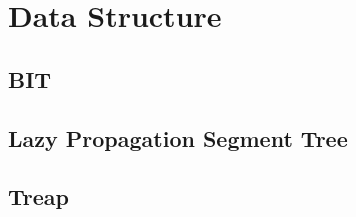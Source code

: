\documentclass[a4paper,10pt,twocolumn,oneside,x11names]{article}
\begin{document}
%

%

%

%

%

\section{Data Structure}

\subsection{BIT}


\subsection{Lazy Propagation Segment Tree}


\subsection{Treap}

\end{document}
